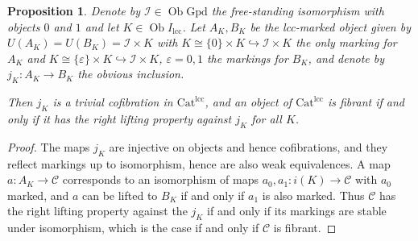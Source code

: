 \documentclass[a4paper]{article}
\newtheorem{proposition}[theorem]{Proposition}
\theoremstyle{remark}
\theoremstyle{definition}
\begin{document}
\begin{proposition}
  \label{prop:object-generating-triv-cof-marked}
  Denote by $\mathcal{I} \in \operatorname{Ob} \mathrm{Gpd}$ the free-standing isomorphism with objects $0$ and $1$ and let $K \in \operatorname{Ob} I_\mathrm{lcc}$.
  Let $A_K, B_K$ be the lcc-marked object given by $U(A_K) = U(B_K) = \mathcal{I} \times K$ with $K \cong \{ 0 \} \times K \hookrightarrow \mathcal{I} \times K$ the only marking for $A_K$ and $K \cong \{ \varepsilon \} \times K \hookrightarrow \mathcal{I} \times K$, $\varepsilon = 0, 1$ the markings for $B_K$, and denote by $j_K : A_K \rightarrow B_K$ the obvious inclusion.

  Then $j_K$ is a trivial cofibration in $\mathrm{Cat}^{\mathrm{lcc}}$, and an object of $\mathrm{Cat}^{\mathrm{lcc}}$ is fibrant if and only if it has the right lifting property against $j_K$ for all $K$.
\end{proposition}
\begin{proof}
  The maps $j_K$ are injective on objects and hence cofibrations, and they reflect markings up to isomorphism, hence are also weak equivalences.
  A map $a : A_K \rightarrow \mathcal{C}$ corresponds to an isomorphism of maps $a_0, a_1 : i(K) \rightarrow \mathcal{C}$ with $a_0$ marked, and $a$ can be lifted to $B_K$ if and only if $a_1$ is also marked.
  Thus $\mathcal{C}$ has the right lifting property against the $j_K$ if and only if its markings are stable under isomorphism, which is the case if and only if $\mathcal{C}$ is fibrant.
\end{proof}
\end{document}

